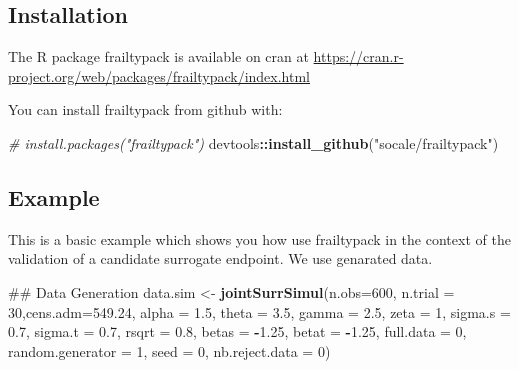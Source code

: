\documentclass[]{article}
\newenvironment{Shaded}{\begin{snugshade}}{\end{snugshade}}
\newcommand{\KeywordTok}[1]{\textcolor[rgb]{0.13,0.29,0.53}{\textbf{#1}}}
\newcommand{\DataTypeTok}[1]{\textcolor[rgb]{0.13,0.29,0.53}{#1}}
\newcommand{\DecValTok}[1]{\textcolor[rgb]{0.00,0.00,0.81}{#1}}
\newcommand{\FloatTok}[1]{\textcolor[rgb]{0.00,0.00,0.81}{#1}}
\newcommand{\StringTok}[1]{\textcolor[rgb]{0.31,0.60,0.02}{#1}}
\newcommand{\CommentTok}[1]{\textcolor[rgb]{0.56,0.35,0.01}{\textit{#1}}}
\newcommand{\OperatorTok}[1]{\textcolor[rgb]{0.81,0.36,0.00}{\textbf{#1}}}
\newcommand{\NormalTok}[1]{#1}
\begin{document}
\subsection{Installation}\label{installation}

The R package frailtypack is available on cran at
\url{https://cran.r-project.org/web/packages/frailtypack/index.html}

You can install frailtypack from github with:

\begin{Shaded}
\begin{Highlighting}[]
\CommentTok{# install.packages("frailtypack")}
\NormalTok{devtools}\OperatorTok{::}\KeywordTok{install_github}\NormalTok{(}\StringTok{"socale/frailtypack"}\NormalTok{)}
\end{Highlighting}
\end{Shaded}

\subsection{Example}\label{example}

This is a basic example which shows you how use frailtypack in the
context of the validation of a candidate surrogate endpoint. We use
genarated data.

\begin{Shaded}
\begin{Highlighting}[]
\NormalTok{## Data Generation}
\NormalTok{data.sim <-}\StringTok{ }\KeywordTok{jointSurrSimul}\NormalTok{(}\DataTypeTok{n.obs=}\DecValTok{600}\NormalTok{, }\DataTypeTok{n.trial =} \DecValTok{30}\NormalTok{,}\DataTypeTok{cens.adm=}\FloatTok{549.24}\NormalTok{, }
    \DataTypeTok{alpha =} \FloatTok{1.5}\NormalTok{, }\DataTypeTok{theta =} \FloatTok{3.5}\NormalTok{, }\DataTypeTok{gamma =} \FloatTok{2.5}\NormalTok{, }\DataTypeTok{zeta =} \DecValTok{1}\NormalTok{, }\DataTypeTok{sigma.s =} \FloatTok{0.7}\NormalTok{, }
    \DataTypeTok{sigma.t =} \FloatTok{0.7}\NormalTok{, }\DataTypeTok{rsqrt =} \FloatTok{0.8}\NormalTok{, }\DataTypeTok{betas =} \OperatorTok{-}\FloatTok{1.25}\NormalTok{, }\DataTypeTok{betat =} \OperatorTok{-}\FloatTok{1.25}\NormalTok{, }\DataTypeTok{full.data =} \DecValTok{0}\NormalTok{, }
    \DataTypeTok{random.generator =} \DecValTok{1}\NormalTok{, }\DataTypeTok{seed =} \DecValTok{0}\NormalTok{, }\DataTypeTok{nb.reject.data =} \DecValTok{0}\NormalTok{)}
\end{Highlighting}
\end{Shaded}
\end{document}
